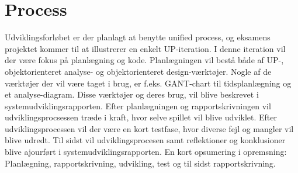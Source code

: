 \section{Process}
Udviklingsforløbet er der planlagt at benytte unified process, og eksamens projektet kommer til at illustrerer en enkelt UP-iteration. 
I denne iteration vil der være fokus på planlægning og kode. Planlægningen vil bestå både af UP-, objektorienteret analyse- og objektorienteret design-værktøjer. Nogle af de værktøjer der vil være taget i brug, er f.eks. GANT-chart til tidsplanlægning og et analyse-diagram. Disse værktøjer og deres brug, vil blive beskrevet i systemudviklingsrapporten. Efter planlægningen og rapportskrivningen vil udviklingsprocsessen træde i kraft, hvor selve spillet vil blive udviklet. Efter udviklingsprocessen vil der være en kort testfase, hvor diverse fejl og mangler vil blive udredt. Til sidst vil udviklingsprocesen samt reflektioner og konklusioner blive ajourført i systemudviklingsrapporten. En kort opsumering i opremsning: Planlægning, rapportskrivning, udvikling, test og til sidst rapportskrivning.

